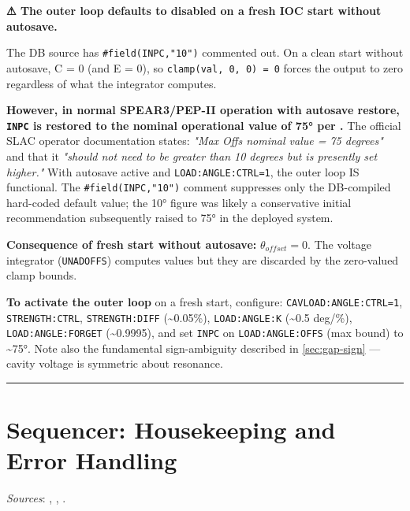 \begin{keynote}
\textbf{⚠ The outer loop defaults to disabled on a fresh IOC start without autosave.}

The DB source has \texttt{\#field(INPC,\allowbreak{}"10")} commented out. On a clean start without autosave, C = 0 (and E = 0), so \texttt{clamp(val,\allowbreak{}\ 0,\allowbreak{}\ 0)\ =\allowbreak{}\ 0} forces the output to zero regardless of what the integrator computes.

\textbf{However, in normal SPEAR3/PEP-II operation with autosave restore, \texttt{INPC} is restored to the nominal operational value of 75° per .} The official SLAC operator documentation states: \emph{"Max Offs nominal value = 75 degrees"} and that it \emph{"should not need to be greater than 10 degrees but is presently set higher."} With autosave active and \texttt{LOAD:\allowbreak{}ANGLE:\allowbreak{}CTRL=\allowbreak{}1}, the outer loop IS functional. The \texttt{\#field(INPC,\allowbreak{}"10")} comment suppresses only the DB-compiled hard-coded default value; the 10° figure was likely a conservative initial recommendation subsequently raised to 75° in the deployed system.

\textbf{Consequence of fresh start without autosave:} \(\theta_{offset} = 0\). The voltage integrator (\texttt{UNADOFFS}) computes values but they are discarded by the zero-valued clamp bounds.

\textbf{To activate the outer loop} on a fresh start, configure: \texttt{CAVLOAD:\allowbreak{}ANGLE:\allowbreak{}CTRL=\allowbreak{}1}, \texttt{STRENGTH:CTRL}, \texttt{STRENGTH:DIFF} (\textasciitilde0.05\%), \texttt{LOAD:ANGLE:K} (\textasciitilde0.5 deg/\%), \texttt{LOAD:\allowbreak{}ANGLE:\allowbreak{}FORGET} (\textasciitilde0.9995), and set \texttt{INPC} on \texttt{LOAD:\allowbreak{}ANGLE:\allowbreak{}OFFS} (max bound) to \textasciitilde75°. Note also the fundamental sign-ambiguity described in \cref{sec:gap-sign} --- cavity voltage is symmetric about resonance.
\end{keynote}

\begin{center}\rule{0.5\linewidth}{0.5pt}\end{center}

\section{Sequencer: Housekeeping and Error Handling}\label{sec:sequencer}

\emph{Sources}: , , .


